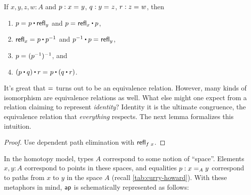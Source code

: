 \documentclass[./thesis.tex]{subfiles}
\begin{document}
\begin{lemma}
  If $x,y,z,w:A$ and $p:\propeq{}{x}{y}$, $q:\propeq{}{y}{z}$, $r:\propeq{}{z}{w}$,
  then
  \begin{enumerate}[label=\alph*)]
    \itemsep0em
    \item $\propeq{}{p}{p\ct\refl{y}}$ and $\propeq{}{p}{\refl{x}\ct p}$,
    \item $\propeq{}{\refl{x}}{p\ct p^{-1}}$ and $\propeq{}{p^{-1}\ct p}{\refl{y}}$,
    \item $\propeq{}{p}{(p^{-1})^{-1}}$, and
    \item $\propeq{}{(p\ct q)\ct r}{p \ct (q\ct r)}$.
  \end{enumerate}
\end{lemma}

It's great that $\propeqsign$ turns out to be an equivalence relation. However,
many kinds of isomorphism are equivalence relations as well. What else might one
expect from a relation claiming to represent \textit{identity}? Identity it is
the ultimate congruence, the equivalence relation that \textit{everything}
respects. The next lemma formalizes this intuition.

\begin{proof}
	Use dependent path elimination with $\refl{\apply{f}{x}}$.
\end{proof}

In the homotopy model, types $A$ correspond to some notion of ``space''. 
Elements $x,y:A$ correspond to points in these spaces, and equalities
$p:\propeq{A}{x}{y}$ correspond to paths from $x$ to $y$ in the space $A$
(recall \cref{tab:curry-howard}). With these metaphors in mind, $\ap$ is
schematically represented as follows:
\end{document}
